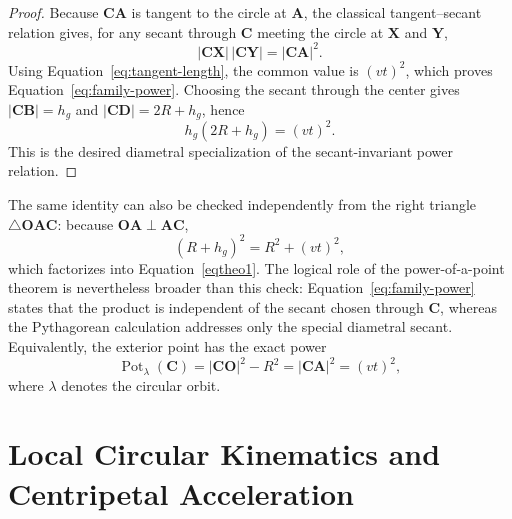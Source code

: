 \documentclass[preprint,12pt,3p,nopreprintline]{elsarticle}
\newcommand{\pt}[1]{\mathbf{#1}}
\newcommand{\seg}[1]{\mathbf{#1}}
\newcommand{\seglen}[1]{\lvert\mathbf{#1}\rvert}
\DeclareMathOperator{\Pot}{Pot}
\newcommand{\be}{\begin{equation}}
\newcommand{\ee}{\end{equation}}
\numberwithin{equation}{section}
\theoremstyle{remark}
\begin{document}
\begin{proof}
Because $\seg{CA}$ is tangent to the circle at $\pt{A}$, the classical tangent--secant relation gives, for any secant through $\pt{C}$ meeting the circle at $\pt{X}$ and $\pt{Y}$,
\be
\seglen{CX}\,\seglen{CY}=\seglen{CA}^{2}.
\ee
Using Equation~\eqref{eq:tangent-length}, the common value is $(vt)^2$, which proves Equation~\eqref{eq:family-power}. Choosing the secant through the center gives $\seglen{CB}=h_g$ and $\seglen{CD}=2R+h_g$, hence
\be
h_g(2R+h_g)=(vt)^2.
\ee
This is the desired diametral specialization of the secant-invariant power relation.
\end{proof}

The same identity can also be checked independently from the right triangle $\triangle \mathbf{OAC}$: because $\seg{OA}\perp\seg{AC}$,
\be
(R+h_g)^2=R^2+(vt)^2,
\label{pytha}
\ee
which factorizes into Equation~\eqref{eqtheo1}. The logical role of the power-of-a-point theorem is nevertheless broader than this check: Equation~\eqref{eq:family-power} states that the product is independent of the secant chosen through $\pt{C}$, whereas the Pythagorean calculation addresses only the special diametral secant. Equivalently, the exterior point has the exact power
\be
\Pot_{\lambda}(\pt{C})=\seglen{CO}^{2}-R^2=\seglen{CA}^{2}=(vt)^2,
\label{eq:power-C}
\ee
where $\lambda$ denotes the circular orbit.

\section{Local Circular Kinematics and Centripetal Acceleration}\label{sec:local-kinematics}
\end{document}
